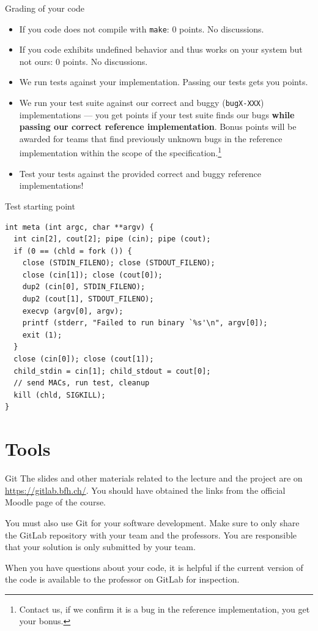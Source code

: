 \documentclass{beamer}
\begin{document}
\begin{frame}{Grading of your code}
  \begin{itemize}
  \item If you code does not compile with {\tt make}: 0 points. No discussions.
  \item If you code exhibits undefined behavior and thus works on your system
        but not ours: 0 points. No discussions.
  \item We run tests against your
    implementation.  Passing our tests gets you points.
  \item We run your test suite against our correct and
    buggy ({\tt bugX-XXX}) implementations
    --- you get points if your test suite finds our bugs {\bf while passing our
      correct reference implementation}. Bonus points will be awarded for teams
    that find previously unknown bugs in the reference implementation within
    the scope of the specification.\footnote{Contact
      us, if we confirm it is a bug in the reference implementation,
      you get your bonus.}
  \item Test your tests against the provided correct and buggy reference
    implementations!
  \end{itemize}
\end{frame}


\begin{frame}[fragile]{Test starting point}
\begin{verbatim}
int meta (int argc, char **argv) {
  int cin[2], cout[2]; pipe (cin); pipe (cout);
  if (0 == (chld = fork ()) {
    close (STDIN_FILENO); close (STDOUT_FILENO);
    close (cin[1]); close (cout[0]);
    dup2 (cin[0], STDIN_FILENO);
    dup2 (cout[1], STDOUT_FILENO);
    execvp (argv[0], argv);
    printf (stderr, "Failed to run binary `%s'\n", argv[0]);
    exit (1);
  }
  close (cin[0]); close (cout[1]);
  child_stdin = cin[1]; child_stdout = cout[0];
  // send MACs, run test, cleanup
  kill (chld, SIGKILL);
}
\end{verbatim}

\end{frame}

\section{Tools}

\begin{frame}{Git}
The slides and other materials related to the lecture and the project
are on \url{https://gitlab.bfh.ch/}. You should have obtained the links from
the official Moodle page of the course.

You must also use Git for your software development. Make sure to only
share the GitLab repository with your team and the professors. You are
responsible that your solution is only submitted by your team.

When you have questions about your code, it is helpful if the current
version of the code is available to the professor on GitLab for
inspection.
\end{frame}
\end{document}
